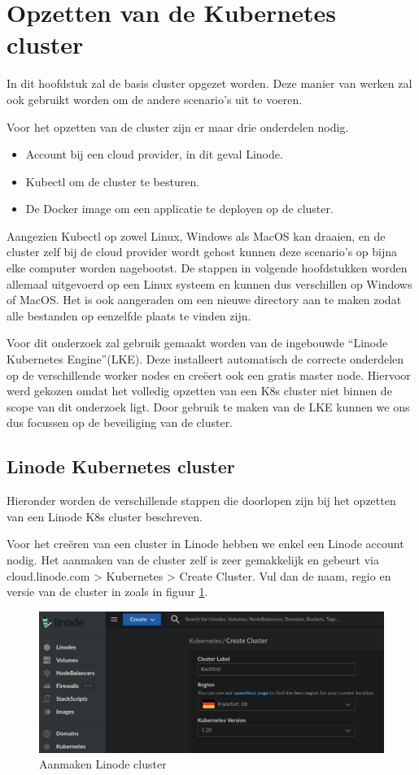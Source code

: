 \section{Opzetten van de Kubernetes cluster}
In dit hoofdstuk zal de basis cluster opgezet worden. Deze manier van werken zal ook gebruikt worden om de andere scenario's uit te voeren.

Voor het opzetten van de cluster zijn er maar drie onderdelen nodig. 
\begin{itemize}
	\item Account bij een cloud provider, in dit geval Linode.
	\item Kubectl om de cluster te besturen.
	\item De Docker image om een applicatie te deployen op de cluster.
\end{itemize}

Aangezien Kubectl op zowel Linux, Windows als MacOS kan draaien, en de cluster zelf bij de cloud provider wordt gehost kunnen deze scenario's op bijna elke computer worden nagebootst. De stappen in volgende hoofdstukken worden allemaal uitgevoerd op een Linux systeem en kunnen dus verschillen op Windows of MacOS. Het is ook aangeraden om een nieuwe directory aan te maken zodat alle bestanden op eenzelfde plaats te vinden zijn.

Voor dit onderzoek zal gebruik gemaakt worden van de ingebouwde ``Linode Kubernetes Engine''(LKE). Deze installeert automatisch de correcte onderdelen op de verschillende worker nodes en creëert ook een gratis master node. Hiervoor werd gekozen omdat het volledig opzetten van een K8s cluster niet binnen de scope van dit onderzoek ligt. Door gebruik te maken van de LKE kunnen we ons dus focussen op de beveiliging van de cluster. 

\subsection{Linode Kubernetes cluster}
Hieronder worden de verschillende stappen die doorlopen zijn bij het opzetten van een Linode K8s cluster beschreven.

Voor het creëren van een cluster in Linode hebben we enkel een Linode account nodig. Het aanmaken van de cluster zelf is zeer gemakkelijk en gebeurt via cloud.linode.com > Kubernetes > Create Cluster. Vul dan de naam, regio en versie van de cluster in zoals in figuur \ref{fig:LinodeNaam}.

\begin{figure}[h]
	\centering
	\includegraphics[width=\linewidth]{img/LinodeClusterNaam.png}
	\caption{Aanmaken Linode cluster}
	\label{fig:LinodeNaam}
\end{figure}

